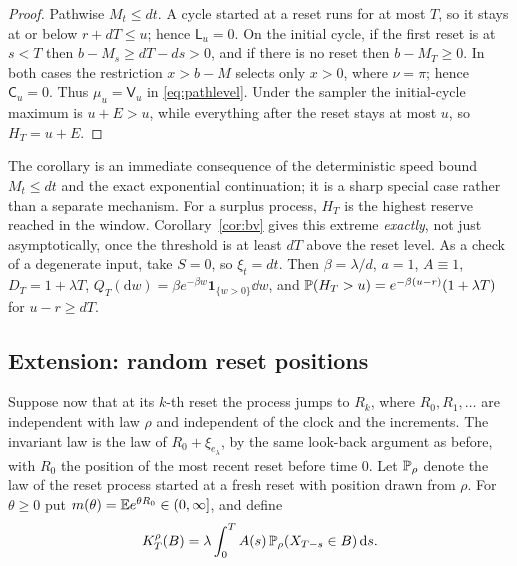 \documentclass[11pt,a4paper]{article}
\begin{document}
\begin{proof}
Pathwise $M_t\le dt$. A cycle started at a reset runs for at most $T$, so it stays at or below $r+dT\le u$; hence $\mathsf L_u=0$. On the initial cycle, if the first reset is at $s<T$ then $b-M_s\ge dT-ds>0$, and if there is no reset then $b-M_T\ge0$. In both cases the restriction $x>b-M$ selects only $x>0$, where $\nu=\pi$; hence $\mathsf C_u=0$. Thus $\mu_u=\mathsf V_u$ in \eqref{eq:pathlevel}. Under the sampler the initial-cycle maximum is $u+E>u$, while everything after the reset stays at most $u$, so $H_T=u+E$.
\end{proof}

The corollary is an immediate consequence of the deterministic speed bound $M_t\le dt$ and the exact exponential continuation; it is a sharp special case rather than a separate mechanism. For a surplus process, $H_T$ is the highest reserve reached in the window. Corollary~\ref{cor:bv} gives this extreme \emph{exactly}, not just asymptotically, once the threshold is at least $dT$ above the reset level. As a check of a degenerate input, take $S=0$, so $\xi_t=dt$. Then $\beta=\lambda/d$, $a=1$, $A\equiv1$, $D_T=1+\lambda T$, $Q_T(\mathrm dw)=\beta e^{-\beta w}\mathbf 1_{\{w>0\}}\dd w$, and $\mathbb P(H_T>u)=e^{-\beta(u-r)}(1+\lambda T)$ for $u-r\ge dT$.

\subsection{Extension: random reset positions}\label{sec:random}

Suppose now that at its $k$-th reset the process jumps to $R_k$, where $R_0,R_1,\dots$ are independent with law $\rho$ and independent of the clock and the increments. The invariant law is the law of $R_0+\xi_{e_\lambda}$, by the same look-back argument as before, with $R_0$ the position of the most recent reset before time $0$. Let $\mathbb P_\rho$ denote the law of the reset process started at a fresh reset with position drawn from $\rho$. For $\theta\ge0$ put $m(\theta)=\mathbb E e^{\theta R_0}\in(0,\infty]$, and define
\[
 K^\rho_T(B)=\lambda\int_0^TA(s)\,\mathbb P_\rho(X_{T-s}\in B)\,\mathrm d s .
\]
\end{document}
